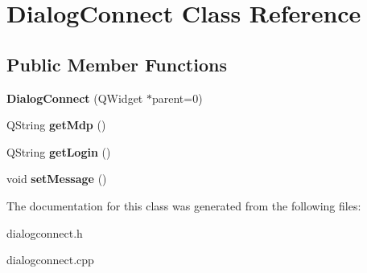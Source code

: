 \hypertarget{classDialogConnect}{\section{Dialog\-Connect Class Reference}
\label{classDialogConnect}
}
\subsection*{Public Member Functions}
\begin{DoxyCompactItemize}
\item 
\hypertarget{classDialogConnect_a15553d3ec61def4e1b9449d6a47ad64e}{{\bfseries Dialog\-Connect} (Q\-Widget $\ast$parent=0)}\label{classDialogConnect_a15553d3ec61def4e1b9449d6a47ad64e}

\item 
\hypertarget{classDialogConnect_ab6c94f7015067e9a01d6fe32a9923c17}{Q\-String {\bfseries get\-Mdp} ()}\label{classDialogConnect_ab6c94f7015067e9a01d6fe32a9923c17}

\item 
\hypertarget{classDialogConnect_add9b0cd52c5d6e023003602530a3de1b}{Q\-String {\bfseries get\-Login} ()}\label{classDialogConnect_add9b0cd52c5d6e023003602530a3de1b}

\item 
\hypertarget{classDialogConnect_a2a3aeaa182b19ea0932cff41970a0c4c}{void {\bfseries set\-Message} ()}\label{classDialogConnect_a2a3aeaa182b19ea0932cff41970a0c4c}

\end{DoxyCompactItemize}


The documentation for this class was generated from the following files\-:\begin{DoxyCompactItemize}
\item 
dialogconnect.\-h\item 
dialogconnect.\-cpp\end{DoxyCompactItemize}
